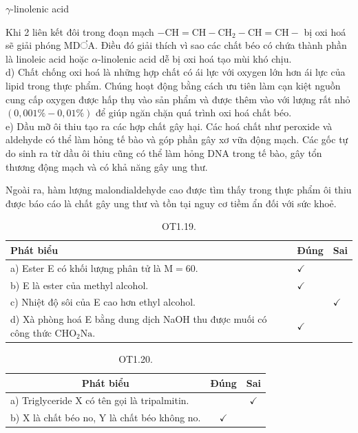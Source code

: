 \documentclass[10pt]{article}
\begin{document}
$\gamma$-linolenic acid

Khi 2 liên kết đôi trong đoạn mạch $-\mathrm{CH}=\mathrm{CH}-\mathrm{CH}_{2}-\mathrm{CH}=\mathrm{CH}-$ bị oxi hoá sẽ giải phóng MDंA. Điều đó giải thích vì sao các chất béo có chứa thành phần là linoleic acid hoặc $\alpha$-linolenic acid dễ bị oxi hoá tạo mùi khó chịu.\\
d) Chất chống oxi hoá là những hợp chất có ái lực với oxygen lớn hơn ái lực của lipid trong thực phẩm. Chúng hoạt động bằng cách ưu tiên làm cạn kiệt nguồn cung cấp oxygen được hấp thụ vào sản phẩm và được thêm vào với lượng rất nhỏ $(0,001 \%-0,01 \%)$ để giúp ngăn chặn quá trình oxi hoá chất béo.\\
e) Dầu mỡ ôi thiu tạo ra các hợp chất gây hại. Các hoá chất như peroxide và aldehyde có thể làm hỏng tế bào và góp phần gây xơ vữa động mạch. Các gốc tự do sinh ra từ dầu ôi thiu cũng có thể làm hỏng DNA trong tế bào, gây tổn thương động mạch và có khả năng gây ung thư.

Ngoài ra, hàm lượng malondialdehyde cao được tìm thấy trong thực phẩm ôi thiu được báo cáo là chất gây ung thư và tồn tại nguy cơ tiềm ẩn đối với sức khoẻ.

\begin{table}[h]
\begin{center}
\captionsetup{labelformat=empty}
\caption{OT1.19.}
\begin{tabular}{|l|l|l|}
\hline
Phát biểu & Đúng & Sai \\
\hline
a) Ester E có khối lượng phân tử là $\mathrm{M}=60$. & $\checkmark$ &  \\
\hline
b) E là ester của methyl alcohol. & $\checkmark$ &  \\
\hline
c) Nhiệt độ sôi của E cao hơn ethyl alcohol. &  & $\checkmark$ \\
\hline
d) Xà phòng hoá E bằng dung dịch NaOH thu được muối có công thức $\mathrm{CHO}_{2} \mathrm{Na}$. & $\checkmark$ &  \\
\hline
\end{tabular}
\end{center}
\end{table}

\begin{table}[h]
\begin{center}
\captionsetup{labelformat=empty}
\caption{OT1.20.}
\begin{tabular}{|l|c|c|}
\hline
\multicolumn{1}{|c|}{Phát biểu} & Đúng & Sai \\
\hline
a) Triglyceride X có tên gọi là tripalmitin. &  & $\checkmark$ \\
\hline
b) X là chất béo no, Y là chất béo không no. & $\checkmark$ &  \\
\hline
\end{tabular}
\end{center}
\end{table}
\end{document}
